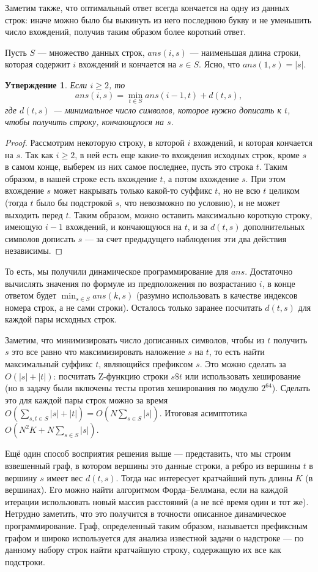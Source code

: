 \documentclass[12pt]{article}
\newtheorem*{prop}{Утверждение}
\theoremstyle{definition}
\begin{document}
Заметим также, что оптимальный ответ всегда кончается на одну из данных строк: иначе можно было бы выкинуть из него последнюю букву и не уменьшить число вхождений, получив таким образом более короткий ответ.

Пусть $S$ --- множество данных строк, $ans(i, s)$ --- наименьшая длина строки, которая содержит $i$ вхождений и кончается на $s \in S$. Ясно, что $ans(1, s) = |s|$.

\begin{prop} Если $i \ge 2$, то
$$ans(i, s) = \min_{t \in S} ans(i - 1, t) + d(t, s),$$
где $d(t, s)$ --- минимальное число символов, которое нужно дописать к $t$, чтобы получить строку, кончающуюся на $s$.
\end{prop}
\begin{proof}
Рассмотрим некоторую строку, в которой $i$ вхождений, и которая кончается на $s$. Так как $i \ge 2$, в ней есть еще какие-то вхождения исходных строк, кроме $s$ в самом конце, выберем из них самое последнее, пусть это строка $t$. Таким образом, в нашей строке есть вхождение $t$, а потом вхождение $s$. При этом вхождение $s$ может накрывать только какой-то суффикс $t$, но не всю $t$ целиком (тогда $t$ было бы подстрокой $s$, что невозможно по условию), и не может выходить перед $t$. Таким образом, можно оставить максимально короткую строку, имеющую $i - 1$ вхождений, и кончающуюся на $t$, и за $d(t, s)$ дополнительных символов дописать $s$ --- за счет предыдущего наблюдения эти два действия независимы.
\end{proof}

То есть, мы получили динамическое программирование для $ans$. Достаточно вычислять значения по формуле из предположения по возрастанию $i$, в конце ответом будет $\min_{s\in S} ans(k, s)$ (разумно использовать в качестве индексов номера строк, а не сами строки). Осталось только заранее посчитать $d(t, s)$ для каждой пары исходных строк.

Заметим, что минимизировать число дописанных символов, чтобы из $t$ получить $s$ это все равно что максимизировать наложение $s$ на $t$, то есть найти максимальный суффикс $t$, являющийся префиксом $s$. Это можно сделать за $O(|s| + |t|)$: посчитать Z-функцию строки $s\$t$ или использовать хеширование (но в задачу были включены тесты против хеширования по модулю $2^{64}$). Сделать это для каждой пары строк можно за время $O(\sum_{s, t \in S} |s| + |t|) = O(N\sum_{s\in S} |s|)$. Итоговая асимптотика $O(N^2K + N\sum_{s \in S} |s|)$.

Ещё один способ восприятия решения выше --- представить, что мы строим взвешенный граф, в котором вершины это данные строки, а ребро из вершины $t$ в вершину $s$ имеет вес $d(t, s)$. Тогда нас интересует кратчайший путь длины $K$ (в вершинах). Его можно найти алгоритмом Форда--Беллмана, если на каждой итерации использовать новый массив расстояний (а не всё время один и тот же). Нетрудно заметить, что это получится в точности описанное динамическое программирование. Граф, определенный таким образом, называется префиксным графом и широко используется для анализа известной задачи о надстроке --- по данному набору строк найти кратчайшую строку, содержащую их все как подстроки.
\end{document}
